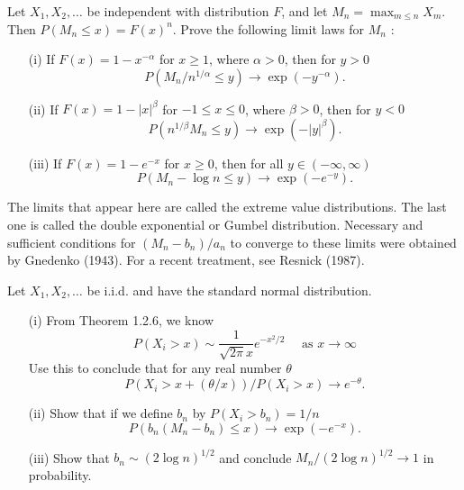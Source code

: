 \documentclass[en, normal, 11pt, black]{elegantnote}
\newenvironment{exercise}[1]{\begin{tcolorbox}[colback=black!15, colframe=black!80, breakable, title=#1]}{\end{tcolorbox}}
\begin{document}
    \begin{exercise}{3.2.2. Convergence of maxima. }
        Let $X_{1}, X_{2}, \ldots$ be independent with distribution $F$, and let $M_{n}=\max _{m \leq n} X_{m} .$ Then $P\left(M_{n} \leq x\right)=F(x)^{n}$. Prove the following limit laws for $M_{n}$ : 
        \begin{itemize}
            \item[(i)] If $F(x)=1-x^{-\alpha}$ for $x \geq 1$, where $\alpha>0$, then for $y>0$
            \[
            P\left(M_{n} / n^{1 / \alpha} \leq y\right) \rightarrow \exp \left(-y^{-\alpha}\right). 
            \]
            \item[(ii)] If $F(x)=1-|x|^{\beta}$ for $-1 \leq x \leq 0$, where $\beta>0$, then for $y<0$
            \[
                P\left(n^{1 / \beta} M_{n} \leq y\right) \rightarrow \exp \left(-|y|^{\beta}\right). 
            \]
            \item[(iii)] If $F(x)=1-e^{-x}$ for $x \geq 0$, then for all $y \in(-\infty, \infty)$
            \[
                P\left(M_{n}-\log n \leq y\right) \rightarrow \exp \left(-e^{-y}\right). 
            \]
        \end{itemize}
    \end{exercise}
    
    The limits that appear here are called the extreme value distributions. The last one is called the double exponential or Gumbel distribution. Necessary and sufficient conditions for $\left(M_{n}-b_{n}\right) / a_{n}$ to converge to these limits were obtained by Gnedenko (1943). For a recent treatment, see Resnick (1987).

    \begin{exercise}{3.2.3}
        Let $X_{1}, X_{2}, \ldots$ be i.i.d. and have the standard normal distribution. 
        \begin{itemize}
            \item[(i)] From Theorem 1.2.6, we know
            \[
                P\left(X_{i}>x\right) \sim \frac{1}{\sqrt{2 \pi} x} e^{-x^{2} / 2} \quad \text { as } x \rightarrow \infty
            \]
            Use this to conclude that for any real number $\theta$
            \[
                P\left(X_{i}>x+(\theta / x)\right) / P\left(X_{i}>x\right) \rightarrow e^{-\theta}. 
            \]
            \item[(ii)] Show that if we define $b_{n}$ by $P\left(X_{i}>b_{n}\right)=1 / n$
            \[
                P\left(b_{n}\left(M_{n}-b_{n}\right) \leq x\right) \rightarrow \exp \left(-e^{-x}\right). 
            \]
            \item[(iii)] Show that $b_{n} \sim(2 \log n)^{1 / 2}$ and conclude $M_{n} /(2 \log n)^{1 / 2} \rightarrow 1$ in probability. 
        \end{itemize}
    \end{exercise}
\end{document}
